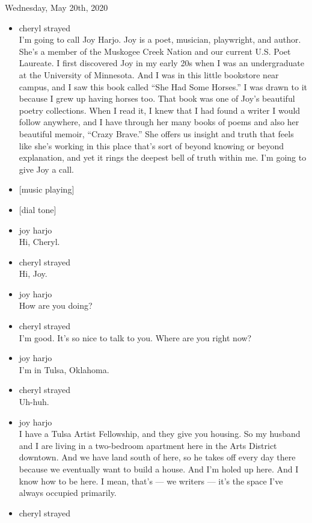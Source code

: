 Wednesday, May 20th, 2020

\begin{itemize}
\item
  cheryl strayed\\
  I'm going to call Joy Harjo. Joy is a poet, musician, playwright, and
  author. She's a member of the Muskogee Creek Nation and our current
  U.S. Poet Laureate. I first discovered Joy in my early 20s when I was
  an undergraduate at the University of Minnesota. And I was in this
  little bookstore near campus, and I saw this book called ``She Had
  Some Horses.'' I was drawn to it because I grew up having horses too.
  That book was one of Joy's beautiful poetry collections. When I read
  it, I knew that I had found a writer I would follow anywhere, and I
  have through her many books of poems and also her beautiful memoir,
  ``Crazy Brave.'' She offers us insight and truth that feels like she's
  working in this place that's sort of beyond knowing or beyond
  explanation, and yet it rings the deepest bell of truth within me. I'm
  going to give Joy a call.
\item
  {[}music playing{]}
\item
  {[}dial tone{]}
\item
  joy harjo\\
  Hi, Cheryl.
\item
  cheryl strayed\\
  Hi, Joy.
\item
  joy harjo\\
  How are you doing?
\item
  cheryl strayed\\
  I'm good. It's so nice to talk to you. Where are you right now?
\item
  joy harjo\\
  I'm in Tulsa, Oklahoma.
\item
  cheryl strayed\\
  Uh-huh.
\item
  joy harjo\\
  I have a Tulsa Artist Fellowship, and they give you housing. So my
  husband and I are living in a two-bedroom apartment here in the Arts
  District downtown. And we have land south of here, so he takes off
  every day there because we eventually want to build a house. And I'm
  holed up here. And I know how to be here. I mean, that's --- we
  writers --- it's the space I've always occupied primarily.
\item
  cheryl strayed\\

\end{itemize}
